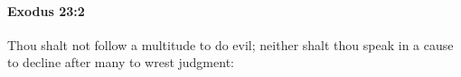 
		\paragraph{Exodus 23:2} %
			\label{EXODUS-23-2}

			Thou shalt not follow a multitude to do evil; neither shalt thou speak in a cause to decline after many to wrest judgment:


